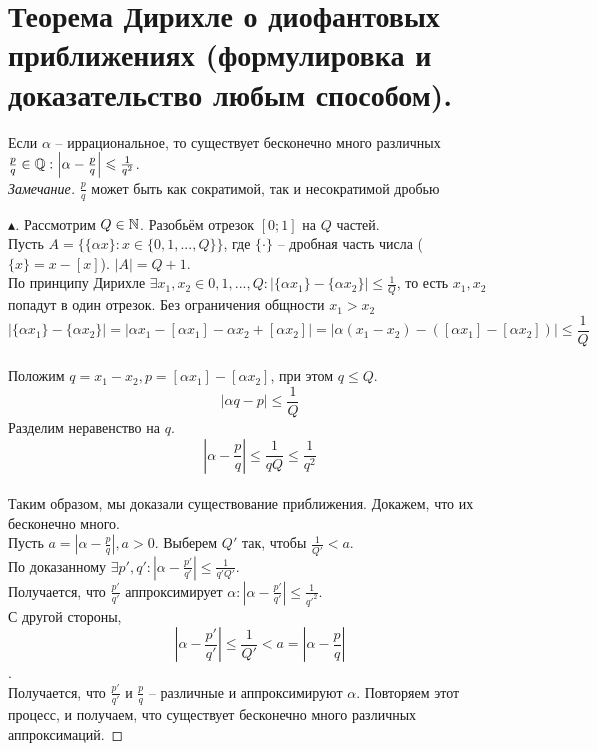 \section{Теорема Дирихле о диофантовых приближениях (формулировка и доказательство любым способом).}

\begin{theorem}[Дирихле]
    Если $\alpha$ -- иррациональное, то существует бесконечно много различных $\frac{p}{q} \in \mathbb{Q} : \left| \alpha - \frac{p}{q} \right| \leqslant \frac{1}{q ^ 2}$.\\
    \textit{Замечание.} $\frac{p}{q}$ может быть как сократимой, так и несократимой дробью
    \begin{proof}[$\blacktriangle$]
        Рассмотрим $Q \in \mathbb{N}$. Разобьём отрезок $[0; 1]$ на $Q$ частей.\\
        Пусть $A = \{ \{ \alpha x\} : x \in \{ 0, 1, ..., Q \} \}$, где $\{ \cdot \}$ -- дробная часть числа ($\{ x \} = x - [x]$). $|A| = Q + 1$.\\
        По принципу Дирихле $\exists x_1, x_2 \in {0, 1, ..., Q}: \left| \{ \alpha x_1 \} - \{ \alpha x_2 \} \right| \leq \frac{1}{Q}$, то есть $x_1, x_2$ попадут в один отрезок. Без ограничения общности $x_1 > x_2$\\
        $$\left| \{ \alpha x_1 \} - \{ \alpha x_2 \} \right| = \left| \alpha x_1 - [\alpha x_1] - \alpha x_2 + [\alpha x_2] \right| = \left| \alpha (x_1 - x_2) - ([\alpha x_1] - [\alpha x_2]) \right| \leq \frac{1}{Q}$$\\
        Положим $q = x_1 - x_2, p = [\alpha x_1] - [\alpha x_2]$, при этом $q \leq Q$.
        $$\left| \alpha q - p \right| \leq \frac{1}{Q}$$
        Разделим неравенство на $q$.
        $$\left| \alpha - \frac{p}{q} \right| \leq \frac{1}{qQ} \leq \frac{1}{q ^ 2}$$\\
        Таким образом, мы доказали существование приближения. Докажем, что их бесконечно много.\\
        Пусть $a = \left| \alpha - \frac{p}{q} \right|, a > 0$. Выберем $Q'$ так, чтобы $\frac{1}{Q'} < a$.\\
        По доказанному $\exists p', q': \left| \alpha - \frac{p'}{q'} \right| \leq \frac{1}{q'Q'}$.\\
        Получается, что $\frac{p'}{q'}$ аппроксимирует $\alpha: \left| \alpha - \frac{p'}{q'} \right| \leq \frac{1}{q'^2}$.\\
        С другой стороны, \\
        $$\left| \alpha - \frac{p'}{q'} \right| \leq \frac{1}{Q'} < a = \left| \alpha - \frac{p}{q} \right|$$.\\
        Получается, что $\frac{p'}{q'}$ и $\frac{p}{q}$ -- различные и аппроксимируют $\alpha$. Повторяем этот процесс, и получаем, что существует бесконечно много различных аппроксимаций.
    \end{proof}
\end{theorem}